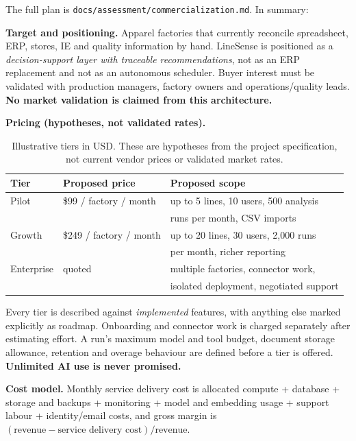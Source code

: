 \documentclass[11pt,a4paper]{article}
\begin{document}
The full plan is \texttt{docs/assessment/commercialization.md}. In summary:

\textbf{Target and positioning.} Apparel factories that currently reconcile
spreadsheet, ERP, stores, IE and quality information by hand. LineSense is
positioned as a \emph{decision-support layer with traceable recommendations},
not as an ERP replacement and not as an autonomous scheduler. Buyer interest
must be validated with production managers, factory owners and operations/quality
leads. \textbf{No market validation is claimed from this architecture.}

\textbf{Pricing (hypotheses, not validated rates).}

\begin{table}[h]
\centering\small
\caption{Illustrative tiers in USD. These are hypotheses from the project
specification, not current vendor prices or validated market rates.}
\begin{tabular}{@{}lll@{}}
\toprule
\textbf{Tier} & \textbf{Proposed price} & \textbf{Proposed scope}\\
\midrule
Pilot & \$99 / factory / month & up to 5 lines, 10 users, 500 analysis\\
 & & runs per month, CSV imports\\
\addlinespace
Growth & \$249 / factory / month & up to 20 lines, 30 users, 2{,}000 runs\\
 & & per month, richer reporting\\
\addlinespace
Enterprise & quoted & multiple factories, connector work,\\
 & & isolated deployment, negotiated support\\
\bottomrule
\end{tabular}
\end{table}

Every tier is described against \emph{implemented} features, with anything else
marked explicitly as roadmap. Onboarding and connector work is charged
separately after estimating effort. A run's maximum model and tool budget,
document storage allowance, retention and overage behaviour are defined before a
tier is offered. \textbf{Unlimited AI use is never promised.}

\textbf{Cost model.} Monthly service delivery cost is allocated compute +
database + storage and backups + monitoring + model and embedding usage +
support labour + identity/email costs, and gross margin is
$(\text{revenue} - \text{service delivery cost}) / \text{revenue}$.
\end{document}
